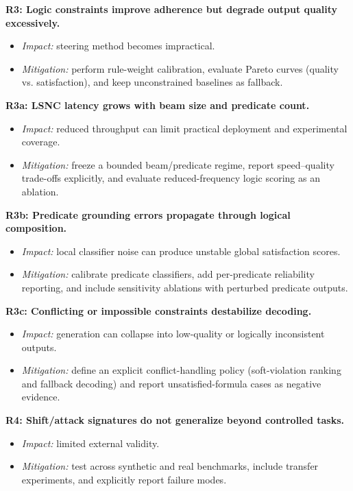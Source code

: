 \documentclass[../../ppgc-prop-tese.tex]{subfiles}
\begin{document}
\textbf{R3: Logic constraints improve adherence but degrade output quality excessively.}
\begin{itemize}
    \item \textit{Impact:} steering method becomes impractical.
    \item \textit{Mitigation:} perform rule-weight calibration, evaluate Pareto curves (quality vs. satisfaction), and keep unconstrained baselines as fallback.
\end{itemize}

\textbf{R3a: LSNC latency grows with beam size and predicate count.}
\begin{itemize}
    \item \textit{Impact:} reduced throughput can limit practical deployment and experimental coverage.
    \item \textit{Mitigation:} freeze a bounded beam/predicate regime, report speed--quality trade-offs explicitly, and evaluate reduced-frequency logic scoring as an ablation.
\end{itemize}

\textbf{R3b: Predicate grounding errors propagate through logical composition.}
\begin{itemize}
    \item \textit{Impact:} local classifier noise can produce unstable global satisfaction scores.
    \item \textit{Mitigation:} calibrate predicate classifiers, add per-predicate reliability reporting, and include sensitivity ablations with perturbed predicate outputs.
\end{itemize}

\textbf{R3c: Conflicting or impossible constraints destabilize decoding.}
\begin{itemize}
    \item \textit{Impact:} generation can collapse into low-quality or logically inconsistent outputs.
    \item \textit{Mitigation:} define an explicit conflict-handling policy (soft-violation ranking and fallback decoding) and report unsatisfied-formula cases as negative evidence.
\end{itemize}

\textbf{R4: Shift/attack signatures do not generalize beyond controlled tasks.}
\begin{itemize}
    \item \textit{Impact:} limited external validity.
    \item \textit{Mitigation:} test across synthetic and real benchmarks, include transfer experiments, and explicitly report failure modes.
\end{itemize}
\end{document}
